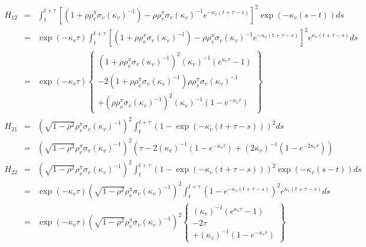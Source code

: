 \documentclass{article}
\begin{document}
\begin{eqnarray*}
H_{12} &=&\int_{t}^{t+\tau }\left[ \left( 1+\rho \rho _{v}^{\pi }\sigma
_{v}\left( \kappa _{v}\right) ^{-1}\right) -\rho \rho _{v}^{\pi }\sigma
_{v}\left( \kappa _{v}\right) ^{-1}e^{-\kappa _{v}\left( t+\tau -s\right) }%
\right] ^{2}\exp \left( -\kappa _{v}\left( s-t\right) \right) ds \\
&=&\exp \left( -\kappa _{v}\tau \right) \int_{t}^{t+\tau }\left[ \left(
1+\rho \rho _{v}^{\pi }\sigma _{v}\left( \kappa _{v}\right) ^{-1}\right)
-\rho \rho _{v}^{\pi }\sigma _{v}\left( \kappa _{v}\right) ^{-1}e^{-\kappa
_{v}\left( t+\tau -s\right) }\right] ^{2}e^{\kappa _{v}\left( t+\tau
-s\right) }ds \\
&=&\exp \left( -\kappa _{v}\tau \right) \left\{ 
\begin{array}{c}
\left( 1+\rho \rho _{v}^{\pi }\sigma _{v}\left( \kappa _{v}\right)
^{-1}\right) ^{2}\left( \kappa _{v}\right) ^{-1}\left( e^{\kappa _{v}\tau
}-1\right) \\ 
-2\left( 1+\rho \rho _{v}^{\pi }\sigma _{v}\left( \kappa _{v}\right)
^{-1}\right) \rho \rho _{v}^{\pi }\sigma _{v}\left( \kappa _{v}\right) ^{-1}
\\ 
+\left( \rho \rho _{v}^{\pi }\sigma _{v}\left( \kappa _{v}\right)
^{-1}\right) ^{2}\left( \kappa _{v}\right) ^{-1}\left( 1-e^{-\kappa _{v}\tau
}\right)%
\end{array}%
\right\}
\end{eqnarray*}%
\begin{eqnarray*}
H_{21} &=&\left( \sqrt{1-\rho ^{2}}\rho _{v}^{\pi }\sigma _{v}\left( \kappa
_{v}\right) ^{-1}\right) ^{2}\int_{t}^{t+\tau }\left( 1-\exp \left( -\kappa
_{v}\left( t+\tau -s\right) \right) \right) ^{2}ds \\
&=&\left( \sqrt{1-\rho ^{2}}\rho _{v}^{\pi }\sigma _{v}\left( \kappa
_{v}\right) ^{-1}\right) ^{2}\left( \tau -2\left( \kappa _{v}\right)
^{-1}\left( 1-e^{-\kappa _{v}\tau }\right) +\left( 2\kappa _{v}\right)
^{-1}\left( 1-e^{-2\kappa _{v}\tau }\right) \right)
\end{eqnarray*}%
\begin{eqnarray*}
H_{22} &=&\left( \sqrt{1-\rho ^{2}}\rho _{v}^{\pi }\sigma _{v}\left( \kappa
_{v}\right) ^{-1}\right) ^{2}\int_{t}^{t+\tau }\left( 1-\exp \left( -\kappa
_{v}\left( t+\tau -s\right) \right) \right) ^{2}\exp \left( -\kappa
_{v}\left( s-t\right) \right) ds \\
&=&\exp \left( -\kappa _{v}\tau \right) \left( \sqrt{1-\rho ^{2}}\rho
_{v}^{\pi }\sigma _{v}\left( \kappa _{v}\right) ^{-1}\right)
^{2}\int_{t}^{t+\tau }\left( 1-e^{-\kappa _{v}\left( t+\tau -s\right)
}\right) ^{2}e^{\kappa _{v}\left( t+\tau -s\right) }ds \\
&=&\exp \left( -\kappa _{v}\tau \right) \left( \sqrt{1-\rho ^{2}}\rho
_{v}^{\pi }\sigma _{v}\left( \kappa _{v}\right) ^{-1}\right) ^{2}\left\{ 
\begin{array}{c}
\left( \kappa _{v}\right) ^{-1}\left( e^{\kappa _{v}\tau }-1\right) \\ 
-2\tau \\ 
+\left( \kappa _{v}\right) ^{-1}\left( 1-e^{-\kappa _{v}\tau }\right)%
\end{array}%
\right\}
\end{eqnarray*}
\end{document}
